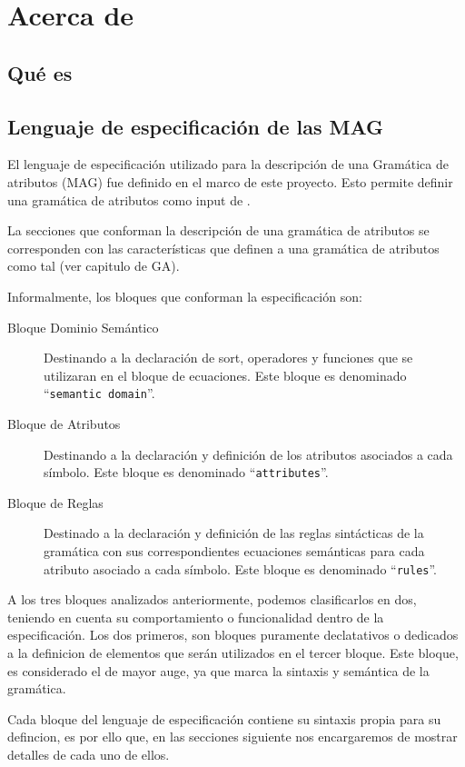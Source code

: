 \chapter{Acerca de \maggen}
\label{chap:disen_}
\minitoc


\section{Qu\'e es \maggen}

\section{Lenguaje de especificaci\'on de las MAG}

El lenguaje de especificación utilizado para la descripción de una Gramática de atributos (MAG) fue definido en el marco de este proyecto. Esto permite definir una gramática de atributos como input de \maggen.
 
La secciones que conforman la descripción de una gramática de atributos se corresponden con las características que definen a una gramática de atributos como tal (ver capitulo de GA).
 
Informalmente, los bloques que conforman la especificación son:
\begin{description}
\item [Bloque Dominio Semántico] Destinando a la declaración de sort, operadores y funciones que se utilizaran en el bloque de ecuaciones. Este bloque es denominado ``\texttt{semantic domain}''.
\item [Bloque de Atributos] Destinando a la declaración y definición de los atributos asociados a cada símbolo. Este bloque es denominado ``\texttt{attributes}''.
\item [Bloque de Reglas] Destinado a la declaración y definición de las reglas sintácticas de la gramática con sus correspondientes ecuaciones semánticas para cada atributo asociado a cada símbolo. Este bloque es denominado ``\texttt{rules}''.
\end{description}

A los tres bloques analizados anteriormente, podemos clasificarlos en dos, teniendo en cuenta su comportamiento o funcionalidad dentro de la especificación. Los dos primeros, son bloques puramente declatativos o dedicados a la definicion de elementos que serán utilizados en el tercer bloque. Este bloque, es considerado el de mayor auge, ya que marca la sintaxis y semántica de la gramática.

Cada bloque del lenguaje de especificación contiene su sintaxis propia para su defincion, es por ello que, en las secciones siguiente nos encargaremos de mostrar detalles de cada uno de ellos.

